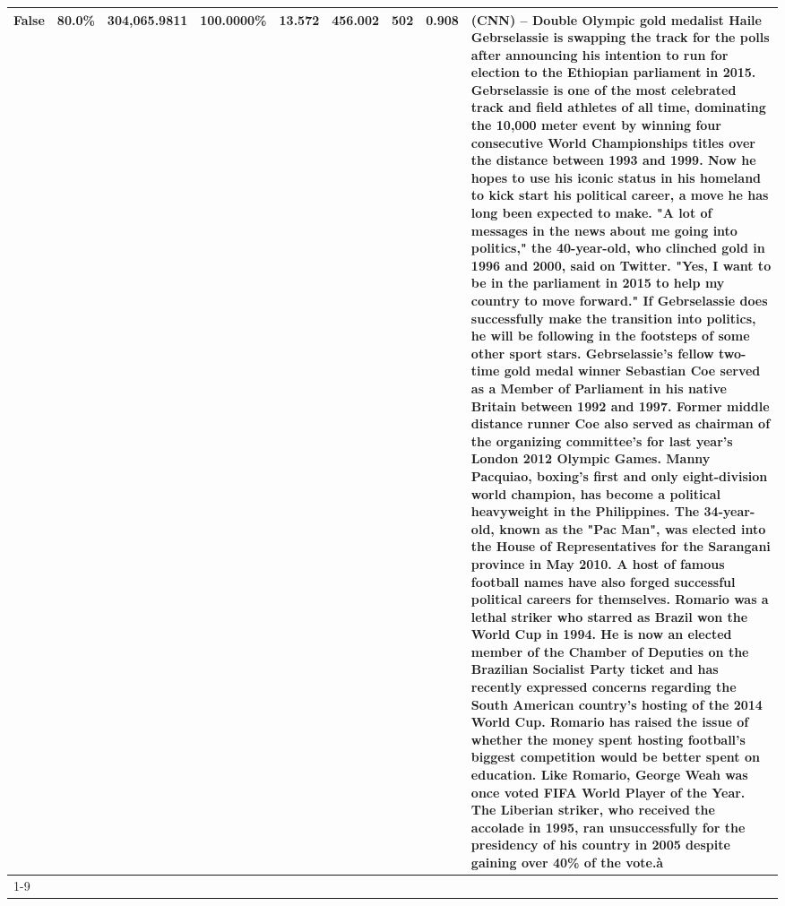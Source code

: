 \begin{table}[H]
{\begin{tabular}{lllrlllll}
False & 80.0\% & 304,065.9811 & \bfseries \color{red} 100.0000\% & 13.572 & 456.002 & 502 & 0.908 & (CNN) -- Double Olympic gold medalist Haile Gebrselassie is swapping the track for the polls after announcing his intention to run for election to the Ethiopian parliament in 2015. Gebrselassie is one of the most celebrated track and field athletes of all time, dominating the 10,000 meter event by winning four consecutive World Championships titles over the distance between 1993 and 1999. Now he hopes to use his iconic status in his homeland to kick start his political career, a move he has long been expected to make. "A lot of messages in the news about me going into politics," the 40-year-old, who clinched gold in 1996 and 2000, said on Twitter. "Yes, I want to be in the parliament in 2015 to help my country to move forward." If Gebrselassie does successfully make the transition into politics, he will be following in the footsteps of some other sport stars. Gebrselassie's fellow two-time gold medal winner Sebastian Coe served as a Member of Parliament in his native Britain between 1992 and 1997. Former middle distance runner Coe also served as chairman of the organizing committee's for last year's London 2012 Olympic Games. Manny Pacquiao, boxing's first and only eight-division world champion, has become a political heavyweight in the Philippines. The 34-year-old, known as the "Pac Man", was elected into the House of Representatives for the Sarangani province in May 2010. A host of famous football names have also forged successful political careers for themselves. Romario was a lethal striker who starred as Brazil won the World Cup in 1994. He is now an elected member of the Chamber of Deputies on the Brazilian Socialist Party ticket and has recently expressed concerns regarding the South American country's hosting of the 2014 World Cup. Romario has raised the issue of whether the money spent hosting football's biggest competition would be better spent on education. Like Romario, George Weah was once voted FIFA World Player of the Year. The Liberian striker, who received the accolade in 1995, ran unsuccessfully for the presidency of his country in 2005 despite gaining over 40\% of the vote.à \\
\cline{1-9}

\end{tabular}}
\end{table}

